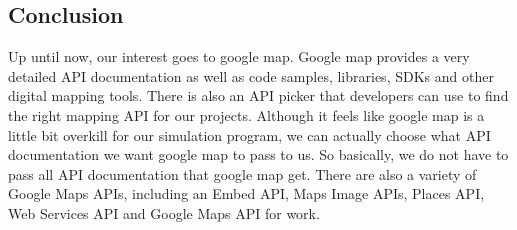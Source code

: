 \documentclass[onecolumn, draftclsnofoot,10pt, compsoc]{IEEEtran}
\begin{document}
\begin{singlespace}
\subsection{Conclusion}
Up until now, our interest goes to google map. Google map provides a very detailed API documentation as well as code samples, libraries, SDKs and other digital mapping tools. There is also an API picker that developers can use to find the right mapping API for our projects. Although it feels like google map is a little bit overkill for our simulation program, we can actually choose what API documentation we want google map to pass to us. So basically, we do not have to pass all API documentation that google map get. There are also a variety of Google Maps APIs, including an Embed API, Maps Image APIs, Places API, Web Services API and Google Maps API for work. 

\vspace{1in}




    \end{singlespace}
\end{document}
